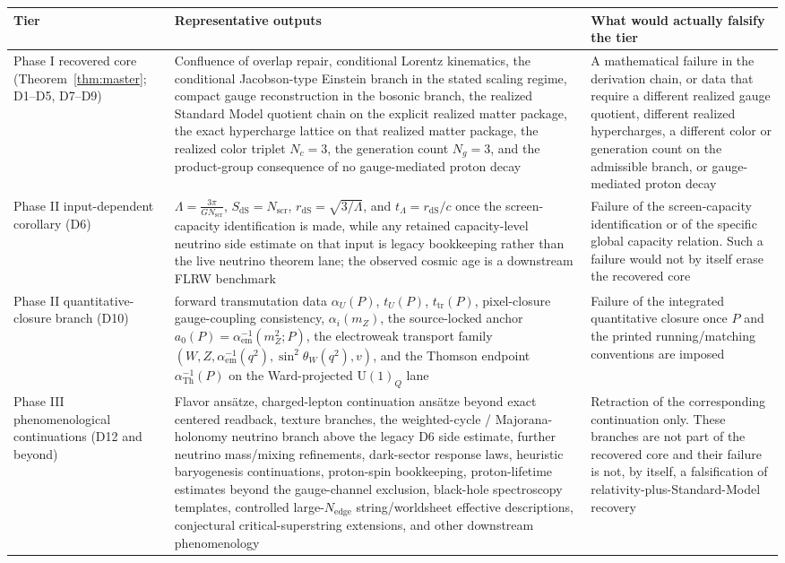 \documentclass[11pt]{article}
\newcommand{\U}{\mathrm{U}}
\begin{document}
\begin{longtable}{@{}>{\raggedright\arraybackslash}p{}>{\raggedright\arraybackslash}p{}>{\raggedright\arraybackslash}p{}@{}}
\toprule
Tier & Representative outputs & What would actually falsify the tier \\
\midrule
\endhead
\bottomrule
\endfoot
Phase I recovered core (Theorem~\ref{thm:master}; D1--D5, D7--D9) & Confluence of overlap repair, conditional Lorentz kinematics, the conditional Jacobson-type Einstein branch in the stated scaling regime, compact gauge reconstruction in the bosonic branch, the realized Standard Model quotient chain on the explicit realized matter package, the exact hypercharge lattice on that realized matter package, the realized color triplet \(N_c=3\), the generation count \(N_g=3\), and the product-group consequence of no gauge-mediated proton decay & A mathematical failure in the derivation chain, or data that require a different realized gauge quotient, different realized hypercharges, a different color or generation count on the admissible branch, or gauge-mediated proton decay \\
Phase II input-dependent corollary (D6) & \(\Lambda=\frac{3\pi}{G N_{\mathrm{scr}}}\), \(S_{\mathrm{dS}}=N_{\mathrm{scr}}\), \(r_{\mathrm{dS}}=\sqrt{3/\Lambda}\), and \(t_\Lambda=r_{\mathrm{dS}}/c\) once the screen-capacity identification is made, while any retained capacity-level neutrino side estimate on that input is legacy bookkeeping rather than the live neutrino theorem lane; the observed cosmic age is a downstream FLRW benchmark & Failure of the screen-capacity identification or of the specific global capacity relation. Such a failure would not by itself erase the recovered core \\
Phase II quantitative-closure branch (D10) & forward transmutation data \(\alpha_U(P)\), \(t_U(P)\), \(t_{\mathrm{tr}}(P)\), pixel-closure gauge-coupling consistency, \(\alpha_i(m_Z)\), the source-locked anchor \(a_0(P)=\alpha_{\mathrm{em}}^{-1}(m_Z^2;P)\), the electroweak transport family \((W,Z,\alpha_{\mathrm{em}}^{-1}(q^2),\sin^2\theta_W(q^2),v)\), and the Thomson endpoint \(\alpha_{\mathrm{Th}}^{-1}(P)\) on the Ward-projected \(\U(1)_Q\) lane & Failure of the integrated quantitative closure once \(P\) and the printed running/matching conventions are imposed \\
Phase III phenomenological continuations (D12 and beyond) & Flavor ans\"atze, charged-lepton continuation ans\"atze beyond exact centered readback, texture branches, the weighted-cycle / Majorana-holonomy neutrino branch above the legacy D6 side estimate, further neutrino mass/mixing refinements, dark-sector response laws, heuristic baryogenesis continuations, proton-spin bookkeeping, proton-lifetime estimates beyond the gauge-channel exclusion, black-hole spectroscopy templates, controlled large-\(N_{\mathrm{edge}}\) string/worldsheet effective descriptions, conjectural critical-superstring extensions, and other downstream phenomenology & Retraction of the corresponding continuation only. These branches are not part of the recovered core and their failure is not, by itself, a falsification of relativity-plus-Standard-Model recovery \\
\end{longtable}
\end{document}

